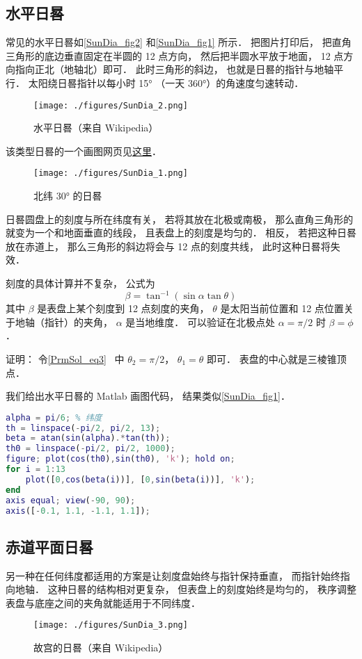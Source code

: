 
\subsection{水平日晷}

常见的水平日晷如\autoref{SunDia_fig2} 和\autoref{SunDia_fig1} 所示． 把图片打印后， 把直角三角形的底边垂直固定在半圆的 12 点方向， 然后把半圆水平放于地面， 12 点方向指向正北（地轴北）即可． 此时三角形的斜边， 也就是日晷的指针与地轴平行． 太阳绕日晷指针以每小时 15° （一天 360°）的角速度匀速转动．

\begin{figure}[ht]
\centering
\texttt{[image: ./figures/SunDia\_2.png]}
\caption{水平日晷（来自 Wikipedia）} \label{SunDia_fig2}
\end{figure}
该类型日晷的一个画图网页见\href{https://www.blocklayer.com/sundial.aspx}{这里}．
\begin{figure}[ht]
\centering
\texttt{[image: ./figures/SunDia\_1.png]}
\caption{北纬 30° 的日晷} \label{SunDia_fig1}
\end{figure}

日晷圆盘上的刻度与所在纬度有关， 若将其放在北极或南极， 那么直角三角形的就变为一个和地面垂直的线段， 且表盘上的刻度是均匀的． 相反， 若把这种日晷放在赤道上， 那么三角形的斜边将会与 12 点的刻度共线， 此时这种日晷将失效．

刻度的具体计算并不复杂， 公式为
\begin{equation}
\beta = \tan^{-1}(\sin\alpha \tan \theta)
\end{equation}
其中 $\beta$ 是表盘上某个刻度到 12 点刻度的夹角， $\theta$ 是太阳当前位置和 12 点位置关于地轴（指针）的夹角， $\alpha$ 是当地维度． 可以验证在北极点处 $\alpha = \pi/2$ 时 $\beta = \phi$．

证明： 令\autoref{PrmSol_eq3}~ 中 $\theta_2 = \pi/2$， $\theta_1 = \theta$ 即可． 表盘的中心就是三棱锥顶点．

我们给出水平日晷的 Matlab 画图代码， 结果类似\autoref{SunDia_fig1}．
\begin{lstlisting}[language=matlab, caption=sunDial.m]
alpha = pi/6; % 纬度
th = linspace(-pi/2, pi/2, 13);
beta = atan(sin(alpha).*tan(th));
th0 = linspace(-pi/2, pi/2, 1000);
figure; plot(cos(th0),sin(th0), 'k'); hold on;
for i = 1:13
    plot([0,cos(beta(i))], [0,sin(beta(i))], 'k');
end
axis equal; view(-90, 90);
axis([-0.1, 1.1, -1.1, 1.1]);
\end{lstlisting}

\subsection{赤道平面日晷}
另一种在任何纬度都适用的方案是让刻度盘始终与指针保持垂直， 而指针始终指向地轴． 这种日晷的结构相对更复杂， 但表盘上的刻度始终是均匀的， 秩序调整表盘与底座之间的夹角就能适用于不同纬度．
\begin{figure}[ht]
\centering
\texttt{[image: ./figures/SunDia\_3.png]}
\caption{故宫的日晷（来自 Wikipedia）} \label{SunDia_fig3}
\end{figure}
